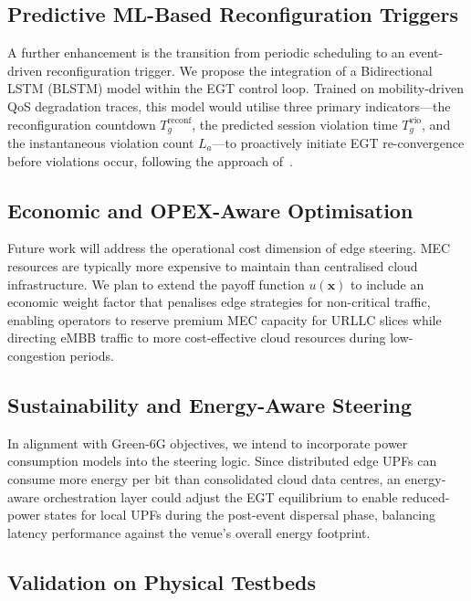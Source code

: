 \documentclass[conference]{IEEEtran}
\begin{document}
\subsection{Predictive ML-Based Reconfiguration Triggers}

A further enhancement is the transition from periodic
scheduling to an event-driven reconfiguration trigger.
We propose the integration of a Bidirectional LSTM
(BLSTM) model within the EGT control loop. Trained on
mobility-driven QoS degradation traces, this model
would utilise three primary indicators---the
reconfiguration countdown $T_g^{\text{reconf}}$, the
predicted session violation time $T_{g}^{\text{vio}}$,
and the instantaneous violation count $L_a$---to
proactively initiate EGT re-convergence before
violations occur, following the approach of~\cite{LeyvaUPC2023}.

\subsection{Economic and OPEX-Aware Optimisation}

Future work will address the operational cost dimension
of edge steering. MEC resources are typically more
expensive to maintain than centralised cloud infrastructure.
We plan to extend the payoff function $u(\mathbf{x})$
to include an economic weight factor that penalises
edge strategies for non-critical traffic, enabling
operators to reserve premium MEC capacity for URLLC
slices while directing eMBB traffic to more
cost-effective cloud resources during low-congestion
periods.

\subsection{Sustainability and Energy-Aware Steering}

In alignment with Green-6G objectives, we intend to
incorporate power consumption models into the steering
logic. Since distributed edge UPFs can consume more
energy per bit than consolidated cloud data centres, an
energy-aware orchestration layer could adjust the EGT
equilibrium to enable reduced-power states for local
UPFs during the post-event dispersal phase, balancing
latency performance against the venue's overall energy
footprint.

\subsection{Validation on Physical Testbeds}
\end{document}
